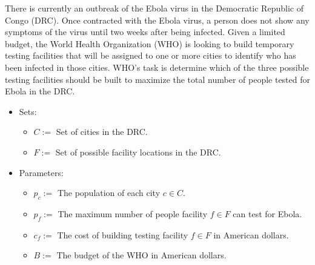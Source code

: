 \documentclass[12pt]{exam}
\newcommand{\answerbox}[3]{%
  \fbox{%
    \begin{minipage}[#1]{#2}
      \hfill\vspace{#3}
    \end{minipage}
  }
}
\newcommand{\answerboxone}[2]{%
  \answerbox{#1}{6.0in}{#2} 
}
\begin{document}
\begin{questions}


\question There is currently an outbreak of the Ebola virus in the Democratic Republic of Congo (DRC). Once contracted with the Ebola virus, a person does not show any symptoms of the virus until two weeks after being infected. Given a limited budget, the World Health Organization (WHO) is looking to build temporary testing facilities that will be assigned to one or more cities to identify who has been infected in those cities. WHO's task is determine which of the three possible testing facilities should be built to maximize the total number of people tested for Ebola in the DRC.

\begin{itemize}

\item Sets:
\begin{itemize}
	\item[] $C:=$ Set of cities in the DRC.
	\item[] $F:=$ Set of possible facility locations in the DRC.
\end{itemize}

\item Parameters:
\begin{itemize}
\item[] $p_c:=$ The population of each city $c \in C$.
\item[] $p_f:=$ The maximum number of people facility $f \in F$ can test for Ebola.
\item[] $c_f:=$ The cost of building testing facility $f \in F$ in American dollars.
\item[] $B:=$ The budget of the WHO in American dollars.


\end{itemize}
\end{itemize}
\medskip

\begin{parts}

\end{parts}
\end{questions}
\end{document}
